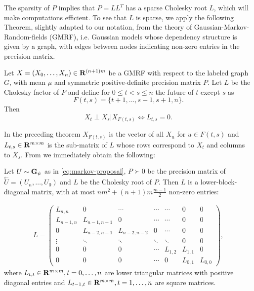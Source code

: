 The sparsity of $P$ implies that $P = LL^{T}$ has a sparse Cholesky root $L$, which will make computations efficient. 
To see that $L$ is sparse, we apply the following Theorem, slightly adapted to our notation, from the theory of Gaussian-Markov-Random-fields (GMRF), i.e. Gaussian models whose dependency structure is given by a graph, with edges between nodes indicating non-zero entries in the precision matrix.
\begin{theorem} 
    \label{thm:gelfand_gmrf}
    Let $X = (X_{0}, \dots, X_{n}) \in \mathbf R^{(n + 1)m}$ be a GMRF with respect to the labeled graph $G$, with mean $\mu$ and symmetric positive-definite precision matrix $P$. Let $L$ be the Cholesky factor of $P$ and define for $0 \leq t < s \leq n$ the future of $t$ except $s$ as 
    $$
        F(t,s) = \{t + 1, \dots, s - 1, s+ 1, n\}.
    $$
    Then
    $$
        X_{t} \perp X_{s} | X_{F(t,s)} \Leftrightarrow L_{t,s} = 0.
    $$
\end{theorem}
In the preceding theorem $X_{F(t,s)}$ is the vector of all $X_{u}$ for $u\in F(t,s)$ and $L_{t,s} \in \mathbf R^{m\times m}$ is the sub-matrix of $L$  whose rows correspond to $X_{t}$ and columns to $X_{s}$. 
From  we immediately obtain the following:

\begin{corollary}
    \label{cor:sparsity_L}
    Let $U \sim \mathbf G_{\psi}$ as in \eqref{eq:markov-proposal}, $P \succ 0$ be the precision matrix of $\overset{\leftarrow}{U} = \left( U_{n}, \dots, U_{0} \right)$ and $L$ be the Cholesky root of $P$. 
    Then $L$ is a lower-block-diagonal matrix, with at most $nm^{2} + (n + 1)m\frac{m - 1}{2}$ non-zero entries:
    
    \begin{align}
        \label{eq:L_structure}
    L = \begin{pmatrix}
        L_{n,n} & 0 & \cdots & \cdots & \cdots & 0 & 0 \\
        L_{n-1, n} & L_{n-1,n-1} & 0 & \cdots & \cdots & 0 & 0\\
        0 & L_{n-2,n-1} & L_{n-2,n-2} & 0 & \cdots & 0 & 0 \\
        \vdots & \ddots & \ddots  & \ddots & \ddots & 0 & 0 \\
        0 & 0& 0& \cdots& L_{1, 2}& L_{1, 1} & 0 \\
        0 & 0 & 0 & \cdots & 0 & L_{0, 1} & L_{0,0} 
    \end{pmatrix},
    \end{align}
    where $L_{t,t} \in \mathbf R^{m\times m}, t = 0, \dots, n$ are lower triangular matrices with positive diagonal entries and $L_{t-1,t}\in\mathbf R^{m \times m}, t = 1, \dots, n$ are square matrices.
\end{corollary}

